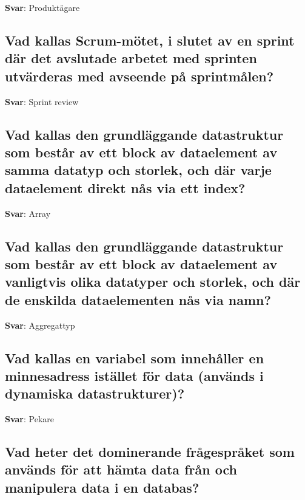 \documentclass[a4paper,11pt,oneside]{article}
\begin{document}
\begin{sloppypar}
\label{q:49:sa:sv:True}

\textbf{Svar}: Produkt\"agare



\subsection{Vad kallas Scrum-m\"otet, i slutet av en sprint d\"ar det avslutade arbetet med sprinten utv\"arderas med avseende p\r{a} sprintm\r{a}len?}

\label{q:50:sa:sv:True}

\textbf{Svar}: Sprint review



\subsection{Vad kallas den grundl\"aggande datastruktur som best\r{a}r av ett block av dataelement av samma datatyp och storlek, och d\"ar varje dataelement direkt n\r{a}s via ett index?}

\label{q:51:sa:sv:True}

\textbf{Svar}: Array



\subsection{Vad kallas den grundl\"aggande datastruktur som best\r{a}r av ett block av dataelement av vanligtvis olika datatyper och storlek, och d\"ar de enskilda dataelementen n\r{a}s via namn?}

\label{q:52:sa:sv:True}

\textbf{Svar}: Aggregattyp



\subsection{Vad kallas en variabel som inneh\r{a}ller en minnesadress ist\"allet f\"or data (anv\"ands i dynamiska datastrukturer)?}

\label{q:53:sa:sv:True}

\textbf{Svar}: Pekare



\subsection{Vad heter det dominerande fr\r{a}gespr\r{a}ket som anv\"ands f\"or att h\"amta data fr\r{a}n och manipulera data i en databas?}


\end{sloppypar}
\end{document}
